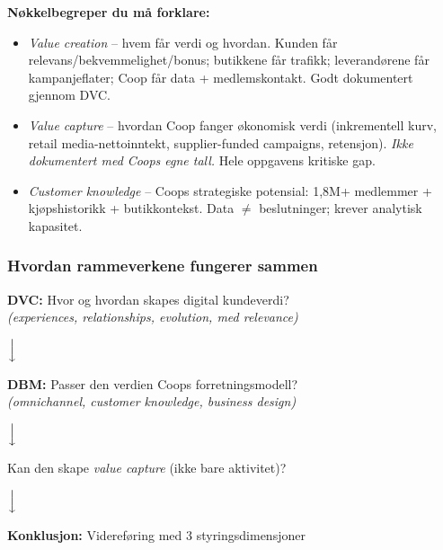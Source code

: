 \textbf{Nøkkelbegreper du må forklare:}
\begin{itemize}
  \item \emph{Value creation} -- hvem får verdi og hvordan. Kunden får
    relevans/bekvemmelighet/bonus; butikkene får trafikk; leverandørene får
    kampanjeflater; Coop får data + medlemskontakt. Godt dokumentert
    gjennom DVC.
  \item \emph{Value capture} -- hvordan Coop fanger økonomisk verdi
    (inkrementell kurv, retail media-nettoinntekt, supplier-funded
    campaigns, retensjon). \emph{Ikke dokumentert med Coops egne tall.}
    Hele oppgavens kritiske gap.
  \item \emph{Customer knowledge} -- Coops strategiske potensial: 1{,}8M+
    medlemmer + kjøpshistorikk + butikkontekst. Data $\neq$ beslutninger;
    krever analytisk kapasitet.
\end{itemize}


\subsubsection*{Hvordan rammeverkene fungerer sammen}
\begin{center}
\begin{tcolorbox}[colback=blue!5,colframe=blue!40!black,width=0.85\linewidth,
  arc=2mm,boxrule=0.4pt,left=4pt,right=4pt,top=4pt,bottom=4pt]
\centering
\textbf{DVC:} Hvor og hvordan skapes digital kundeverdi? \\
\emph{\small (experiences, relationships, evolution, med relevance)}
\end{tcolorbox}
$\Big\downarrow$ \\[2pt]
\begin{tcolorbox}[colback=blue!5,colframe=blue!40!black,width=0.85\linewidth,
  arc=2mm,boxrule=0.4pt,left=4pt,right=4pt,top=4pt,bottom=4pt]
\centering
\textbf{DBM:} Passer den verdien Coops forretningsmodell? \\
\emph{\small (omnichannel, customer knowledge, business design)}
\end{tcolorbox}
$\Big\downarrow$ \\[2pt]
\begin{tcolorbox}[colback=blue!5,colframe=blue!40!black,width=0.85\linewidth,
  arc=2mm,boxrule=0.4pt,left=4pt,right=4pt,top=4pt,bottom=4pt]
\centering
Kan den skape \emph{value capture} (ikke bare aktivitet)?
\end{tcolorbox}
$\Big\downarrow$ \\[2pt]
\begin{tcolorbox}[colback=blue!10,colframe=blue!50!black,width=0.85\linewidth,
  arc=2mm,boxrule=0.6pt,left=4pt,right=4pt,top=4pt,bottom=4pt]
\centering
\textbf{Konklusjon:} Videreføring med 3 styringsdimensjoner
\end{tcolorbox}
\end{center}

